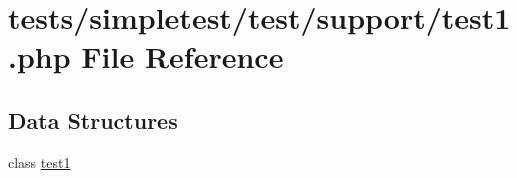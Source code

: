 \hypertarget{test1_8php}{\section{tests/simpletest/test/support/test1.php File Reference}
\label{test1_8php}
}
\subsection*{Data Structures}
\begin{DoxyCompactItemize}
\item 
class \hyperlink{classtest1}{test1}
\end{DoxyCompactItemize}
